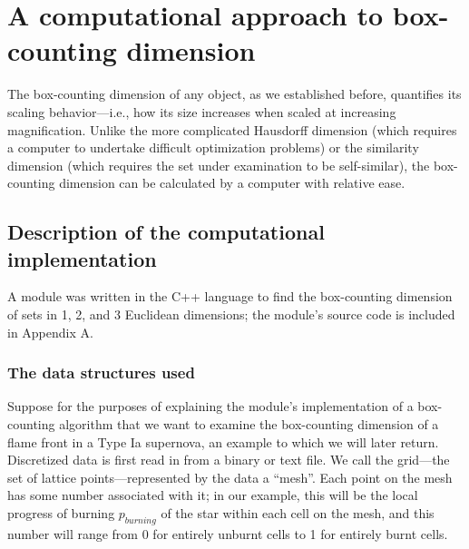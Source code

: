 
\chapter{A computational approach to box-counting dimension} %

\label{Chapter2} %


The box-counting dimension of any object, as we established before, quantifies its scaling behavior---i.e., how its size increases when scaled at increasing magnification. Unlike the more complicated Hausdorff dimension (which requires a computer to undertake difficult optimization problems) or the similarity dimension (which requires the set under examination to be self-similar), the box-counting dimension can be calculated by a computer with relative ease. 

\section{Description of the computational implementation}
A module was written in the C++ language to find the box-counting dimension of sets in 1, 2, and 3 Euclidean dimensions; the module's source code is included in Appendix A. 

\subsection{The data structures used} Suppose for the purposes of explaining the module's implementation of a box-counting algorithm that we want to examine the box-counting dimension of a flame front in a Type Ia supernova, an example to which we will later return. Discretized data is first read in from a binary or text file. We call the grid---the set of lattice points---represented by the data a ``mesh''. Each point on the mesh has some number associated with it; in our example, this will be the local progress of burning $p_{burning}$ of the star within each cell on the mesh, and this number will range from 0 for entirely unburnt cells to 1 for entirely burnt cells. 

